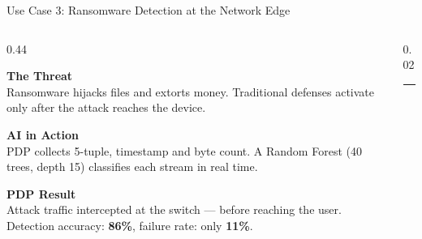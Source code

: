 {
\begin{frame}{Use Case 3: Ransomware Detection at the Network Edge}
      \vspace{7pt}

  \begin{columns}[T, totalwidth=\textwidth]

    \begin{column}{0.44\textwidth}

      \begin{tcolorbox}[problemcard=problemred]
        {\color{problemred}\bfseries\scriptsize The Threat}\\[2pt]
        {\footnotesize\color{HUAdark}
        Ransomware hijacks files and extorts money.
        Traditional defenses activate only after
        the attack reaches the device.}
      \end{tcolorbox}

      \vspace{6pt}

      \begin{tcolorbox}[problemcard=HUAblue]
        {\color{HUAblue}\bfseries\scriptsize AI in Action}\\[2pt]
        {\footnotesize\color{HUAdark}
          PDP collects 5-tuple, timestamp and byte count.
          A Random Forest (40 trees, depth 15)
          classifies each stream in real time.}
      \end{tcolorbox}

      \vspace{6pt}

      \begin{tcolorbox}[problemcard=solutiongreen]
        {\color{solutiongreen}\bfseries\scriptsize PDP Result}\\[2pt]
        {\footnotesize\color{HUAdark}
          Attack traffic intercepted at the
          switch --- before reaching the user.
          Detection accuracy: \textbf{86\%},
          failure rate: only \textbf{11\%}.}
      \end{tcolorbox}

    \end{column}

    \begin{column}{0.02\textwidth}
      \centering
      \textcolor{HUAlight}{\rule{0.5pt}{0.80\textheight}}
    \end{column}


\end{columns}
\end{frame}}
